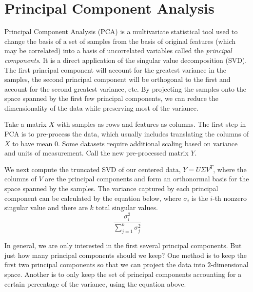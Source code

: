 \label{lab:pca} 

\section*{Principal Component Analysis} %

Principal Component Analysis (PCA) is a multivariate statistical tool used to change the basis of a set of samples from the basis of original features (which may be correlated) into a basis of uncorrelated variables called the \emph{principal components}.
It is a direct application of the singular value decomposition (SVD).
The first principal component will account for the greatest variance in the samples, the second principal component will be orthogonal to the first and account for the second greatest variance, etc.
By projecting the samples onto the space spanned by the first few principal components, we can reduce the dimensionality of the data while preserving most of the variance.

Take a matrix $X$ with samples as rows and features as columns.
The first step in PCA is to pre-process the data, which usually includes translating the columns of $X$ to have mean 0.
Some datasets require additional scaling based on variance and units of measurement.
Call the new pre-processed matrix $Y$.

We next compute the truncated SVD of our centered data, $Y = U\Sigma V^{T}$, where the columns of $V$ are the principal components and form an orthonormal basis for the space spanned by the samples.
The variance captured by each principal component can be calculated by the equation below, where $\sigma_{i}$ is the $i$-th nonzero singular value and there are $k$ total singular values.
\begin{equation}
\frac{\sigma^2_{i}}{\sum_{j=1}^{k} \sigma^2_{j}}
\label{equation:pc}
\end{equation}

In general, we are only interested in the first several principal components.
But just how many principal components should we keep?
One method is to keep the first two principal components so that we can project the data into $2$-dimensional space.
Another is to only keep the set of principal components accounting for a certain percentage of the variance, using the equation above.

